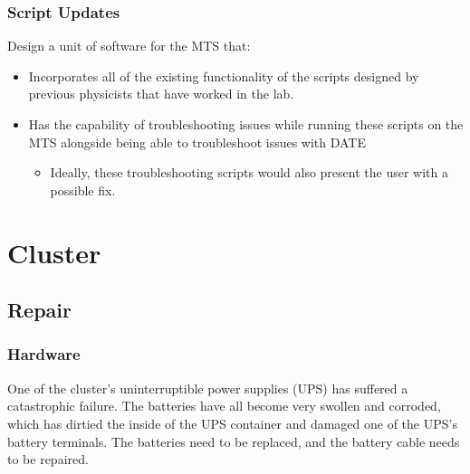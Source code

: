 \documentclass[12pt]{article}
\newcommand\tab[1][1cm]{\hspace*{#1}}
\begin{document}
\subsubsection*{Script Updates}
%
\tab Design a unit of software for the MTS that:
\begin{itemize}
	\item Incorporates all of the existing functionality of the scripts designed by previous physicists that have worked in the lab.
	\item Has the capability of troubleshooting issues while running these scripts on the MTS alongside being able to troubleshoot issues with DATE
	\begin{itemize}
		\item Ideally, these troubleshooting scripts would also present the user with a possible fix.
	\end{itemize}	
\end{itemize}

\section*{Cluster}
%
\subsection*{Repair}
%
\subsubsection*{Hardware}
%
\tab One of the cluster’s uninterruptible power supplies (UPS) has suffered a catastrophic failure. The batteries have all become very swollen and corroded, which has dirtied the inside of the UPS container and damaged one of the UPS’s battery terminals. The batteries need to be replaced, and the battery cable needs to be repaired. 
\end{document}
